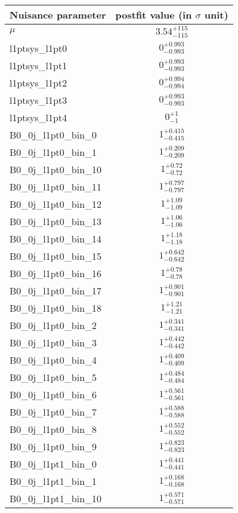 
\begin{tabular}{|l|c|}
\hline
Nuisance parameter & postfit value (in $\sigma$ unit) \\\hline
$\mu$ & $3.54^{+115}_{-115}$ \\
l1ptsys\_l1pt0 & $0^{+0.993}_{-0.993}$ \\
l1ptsys\_l1pt1 & $0^{+0.993}_{-0.993}$ \\
l1ptsys\_l1pt2 & $0^{+0.994}_{-0.994}$ \\
l1ptsys\_l1pt3 & $0^{+0.993}_{-0.993}$ \\
l1ptsys\_l1pt4 & $0^{+1}_{-1}$ \\
B0\_0j\_l1pt0\_bin\_0 & $1^{+0.415}_{-0.415}$ \\
B0\_0j\_l1pt0\_bin\_1 & $1^{+0.209}_{-0.209}$ \\
B0\_0j\_l1pt0\_bin\_10 & $1^{+0.72}_{-0.72}$ \\
B0\_0j\_l1pt0\_bin\_11 & $1^{+0.797}_{-0.797}$ \\
B0\_0j\_l1pt0\_bin\_12 & $1^{+1.09}_{-1.09}$ \\
B0\_0j\_l1pt0\_bin\_13 & $1^{+1.06}_{-1.06}$ \\
B0\_0j\_l1pt0\_bin\_14 & $1^{+1.18}_{-1.18}$ \\
B0\_0j\_l1pt0\_bin\_15 & $1^{+0.642}_{-0.642}$ \\
B0\_0j\_l1pt0\_bin\_16 & $1^{+0.78}_{-0.78}$ \\
B0\_0j\_l1pt0\_bin\_17 & $1^{+0.901}_{-0.901}$ \\
B0\_0j\_l1pt0\_bin\_18 & $1^{+1.21}_{-1.21}$ \\
B0\_0j\_l1pt0\_bin\_2 & $1^{+0.341}_{-0.341}$ \\
B0\_0j\_l1pt0\_bin\_3 & $1^{+0.442}_{-0.442}$ \\
B0\_0j\_l1pt0\_bin\_4 & $1^{+0.409}_{-0.409}$ \\
B0\_0j\_l1pt0\_bin\_5 & $1^{+0.484}_{-0.484}$ \\
B0\_0j\_l1pt0\_bin\_6 & $1^{+0.561}_{-0.561}$ \\
B0\_0j\_l1pt0\_bin\_7 & $1^{+0.588}_{-0.588}$ \\
B0\_0j\_l1pt0\_bin\_8 & $1^{+0.552}_{-0.552}$ \\
B0\_0j\_l1pt0\_bin\_9 & $1^{+0.823}_{-0.823}$ \\
B0\_0j\_l1pt1\_bin\_0 & $1^{+0.441}_{-0.441}$ \\
B0\_0j\_l1pt1\_bin\_1 & $1^{+0.168}_{-0.168}$ \\
B0\_0j\_l1pt1\_bin\_10 & $1^{+0.571}_{-0.571}$ \\

\end{tabular}
